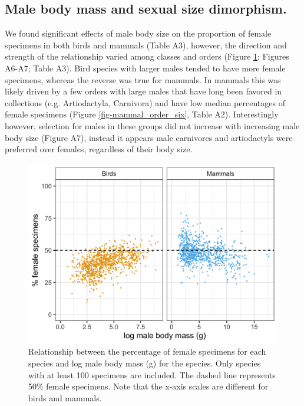 \documentclass[a4paper, 12pt]{article}
\begin{document}
\subsection{Male body mass and sexual size dimorphism.}
We found significant effects of male body size on the proportion of female specimens in both birds and mammals (Table A3), however, the direction and strength of the relationship varied among classes and orders (Figure \ref{fig-male-mass}; Figures A6-A7; Table A3). 
Bird species with larger males tended to have more female specimens, whereas the reverse was true for mammals. 
In mammals this was likely driven by a few orders with large males that have long been favored in collections (e.g. Artiodactyla, Carnivora) and have low median percentages of female specimens (Figure \ref{fig-mammal_order_six}, Table A2). 
Interestingly however, selection for males in these groups did not increase with increasing male body size (Figure A7), instead it appears male carnivores and artiodactyls were preferred over females, regardless of their body size.

\begin{figure}
 \centering
  \includegraphics[width = \linewidth]{figures/male-mass-all.png}
  \caption{Relationship between the percentage of female specimens for each species and log male body mass (g) for the species. 
  Only species with at least 100 specimens are included. 
  The dashed line represents 50\% female specimens. 
  Note that the x-axis scales are different for birds and mammals.
}
  \label{fig-male-mass}
\end{figure}
\end{document}
